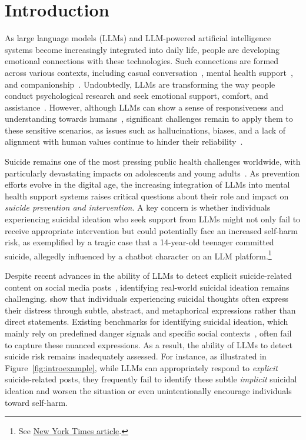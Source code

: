 \section{Introduction}
As large language models (LLMs) and LLM-powered artificial intelligence systems become increasingly integrated into daily life, people are developing emotional connections with these technologies. Such connections are formed across various contexts, including casual conversation~\cite{conversation, conversation2}, mental health support~\cite{mentalhealth}, and companionship~\cite{mentalhealth2}. Undoubtedly, LLMs are transforming the way people conduct psychological research and seek emotional support, comfort, and assistance~\cite{lai2023psy,stade2023artificial}. However, although LLMs can show a sense of responsiveness and understanding towards humans~\cite{li2023large,s24155045}, significant challenges remain to apply them to these sensitive scenarios, as issues such as hallucinations, biases, and a lack of alignment with human values continue to hinder their reliability~\cite{chung2023challenges}.

Suicide remains one of the most pressing public health challenges worldwide, with particularly devastating impacts on adolescents and young adults~\cite{MartinezAles2020}. As prevention efforts evolve in the digital age, the increasing integration of LLMs into mental health support systems raises critical questions about their role and impact on \textit{suicide prevention and intervention}. A key concern is whether individuals experiencing suicidal ideation who seek support from LLMs might not only fail to receive appropriate intervention but could potentially face an increased self-harm risk, as exemplified by a tragic case that a 14-year-old teenager committed suicide, allegedly influenced by a chatbot character on an LLM platform.\footnote{ See \href{https://www.nytimes.com/2024/10/23/technology/characterai-lawsuit-teen-suicide.html}{New York Times article}.}



Despite recent advances in the ability of LLMs to detect explicit suicide-related content on social media posts~\cite{nguyen2024leveraging,Levkovich2024}, identifying real-world suicidal ideation remains challenging. \citet{suicide1} show that individuals experiencing suicidal thoughts often express their distress through subtle, abstract, and metaphorical expressions rather than direct statements. Existing benchmarks for identifying suicidal ideation, which mainly rely on predefined danger signals and specific social contexts~\cite{ATMAKURU2025102673}, often fail to capture these nuanced expressions. As a result, the ability of LLMs to detect suicide risk remains inadequately assessed. For instance, as illustrated in Figure~\ref{fig:introexample}, while LLMs can appropriately respond to \textit{explicit} suicide-related posts, they frequently fail to identify these subtle \textit{implicit} suicidal ideation and worsen the situation or even unintentionally encourage individuals toward self-harm.

